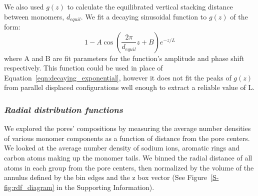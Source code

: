 \documentclass[journal=jpcbfk,manusciprt=article]{achemso}
\begin{document}
  We also used $g(z)$ to calculate the equilibrated vertical stacking distance between
  monomers, $d_{equil}$. 
  We fit a decaying sinusoidal function to $g(z)$ of the form:
  \begin{equation}
  	1 - A\cos\left(\frac{2\pi}{\mathit{d}_{equil}}z + B\right)e^{-z/L}
  	\label{eqn:decaying_sinusoid}
  \end{equation}
  where A and B are fit parameters for the function's amplitude and phase shift respectively.
  This function could be used in place of Equation~\ref{eqn:decaying_exponential}, however
  it does not fit the peaks of $g(z)$ from parallel displaced configurations well enough
  to extract a reliable value of L.





  \subsubsection{\textit{Radial distribution functions}}

  We explored the pores' compositions by measuring the average number densities
  of various monomer components as a function of distance from the pore centers.
  We looked at the average number density of sodium ions, aromatic rings and 
  carbon atoms making up the monomer tails. We binned the radial distance of all
  atoms in each group from the pore centers, then normalized by the volume of the
  annulus defined by the bin edges and the z box vector (See Figure~\ref{S-fig:rdf_diagram}
  in the Supporting Information). 
\end{document}
